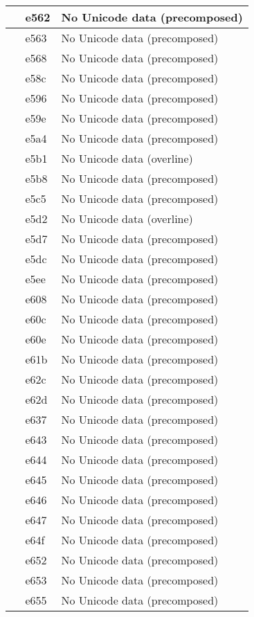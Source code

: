 \documentclass[12pt,letterpaper,openany]{book}
\begin{document}
\begin{center}
\begin{supertabular}{|m{0.25in}|m{0.5in}|m{4in}|}
 & e562 & No Unicode data (precomposed)\\\hline
 & e563 & No Unicode data (precomposed)\\\hline
 & e568 & No Unicode data (precomposed)\\\hline
 & e58c & No Unicode data (precomposed)\\\hline
 & e596 & No Unicode data (precomposed)\\\hline
 & e59e & No Unicode data (precomposed)\\\hline
 & e5a4 & No Unicode data (precomposed)\\\hline
 & e5b1 & No Unicode data (overline)\\\hline
 & e5b8 & No Unicode data (precomposed)\\\hline
 & e5c5 & No Unicode data (precomposed)\\\hline
 & e5d2 & No Unicode data (overline)\\\hline
 & e5d7 & No Unicode data (precomposed)\\\hline
 & e5dc & No Unicode data (precomposed)\\\hline
 & e5ee & No Unicode data (precomposed)\\\hline
 & e608 & No Unicode data (precomposed)\\\hline
 & e60c & No Unicode data (precomposed)\\\hline
 & e60e & No Unicode data (precomposed)\\\hline
 & e61b & No Unicode data (precomposed)\\\hline
 & e62c & No Unicode data (precomposed)\\\hline
 & e62d & No Unicode data (precomposed)\\\hline
 & e637 & No Unicode data (precomposed)\\\hline
 & e643 & No Unicode data (precomposed)\\\hline
 & e644 & No Unicode data (precomposed)\\\hline
 & e645 & No Unicode data (precomposed)\\\hline
 & e646 & No Unicode data (precomposed)\\\hline
 & e647 & No Unicode data (precomposed)\\\hline
 & e64f & No Unicode data (precomposed)\\\hline
 & e652 & No Unicode data (precomposed)\\\hline
 & e653 & No Unicode data (precomposed)\\\hline
 & e655 & No Unicode data (precomposed)\\\hline

\end{supertabular}
\end{center}
\end{document}

